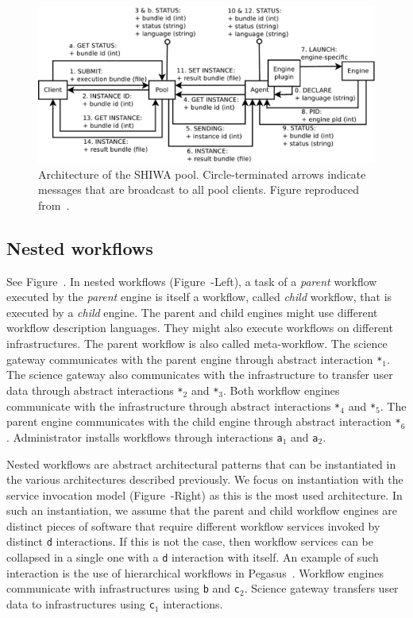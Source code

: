 \documentclass[preprint,3p,twocolumn]{elsarticle}
\begin{document}
\begin{figure}
\centering
\includegraphics[width=1.5\columnwidth]{figures/pool-interactions.pdf}
\caption{Architecture of the SHIWA pool. Circle-terminated arrows indicate messages
  that are broadcast to all pool clients. Figure reproduced
  from~\cite{ROGE-13}.}
\label{fig:shiwa-pool-architecture}
\end{figure}


\subsection{Nested workflows}

See Figure~. In nested workflows
(Figure~-Left), a task of a \emph{parent}
workflow executed by the \emph{parent} engine is itself a workflow,
called \emph{child} workflow, that is executed by a \emph{child}
engine. The parent and child engines might use different workflow
description languages. They might also execute workflows on different
infrastructures. The parent workflow is also called meta-workflow. The
science gateway communicates with the parent engine through abstract
interaction \texttt{*$_1$}. The science gateway also communicates with
the infrastructure to transfer user data through abstract interactions
\texttt{*$_2$} and \texttt{*$_3$}. Both workflow engines communicate
with the infrastructure through abstract interactions \texttt{*$_4$}
and \texttt{*$_5$}. The parent engine communicates with the child
engine through abstract interaction \texttt{*$_6$}. Administrator
installs workflows through interactions \texttt{a$_1$} and
\texttt{a$_2$}.

Nested workflows are abstract architectural patterns that can be
instantiated in the various architectures described previously. We
focus on instantiation with the service invocation model
(Figure~-Right) as this is the most used
architecture. In such an instantiation, we assume that the parent and
child workflow engines are distinct pieces of software that require
different workflow services invoked by distinct \texttt{d}
interactions. If this is not the case, then workflow services can be
collapsed in a single one with a \texttt{d} interaction with
itself. An example of such interaction is the use of hierarchical
workflows in Pegasus~\cite{Deelman201517}.
Workflow engines communicate with infrastructures using
\texttt{b} and \texttt{c$_2$}. Science gateway transfers user data to
infrastructures using \texttt{c$_1$} interactions.
\end{document}
